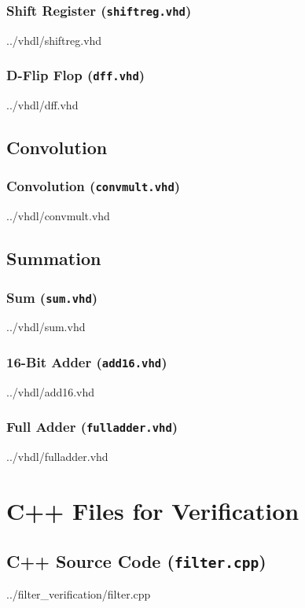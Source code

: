 \documentclass[12pt]{article}
\newcommand{\VhdlListing}{}
\newcommand{\CppListing}{}
\begin{document}
\subsubsection{Shift Register (\texttt{shiftreg.vhd})}
\VhdlListing{../vhdl/shiftreg.vhd}
\label{lst:shiftreg.vhd}

\subsubsection{D-Flip Flop (\texttt{dff.vhd})}
\VhdlListing{../vhdl/dff.vhd}
\label{lst:dff.vhd}

\subsection{Convolution}

\subsubsection{Convolution (\texttt{convmult.vhd})}
\VhdlListing{../vhdl/convmult.vhd}
\label{lst:convmult.vhd}

\subsection{Summation}

\subsubsection{Sum (\texttt{sum.vhd})}
\VhdlListing{../vhdl/sum.vhd}
\label{lst:sum.vhd}

\subsubsection{16-Bit Adder (\texttt{add16.vhd})}
\VhdlListing{../vhdl/add16.vhd}
\label{lst:add16.vhd}

\subsubsection{Full Adder (\texttt{fulladder.vhd})}
\VhdlListing{../vhdl/fulladder.vhd}
\label{lst:fulladder.vhd}

\section{C++ Files for Verification}

\subsection{C++ Source Code (\texttt{filter.cpp})}
\CppListing{../filter_verification/filter.cpp}
\label{lst:filter.cpp}
\end{document}
